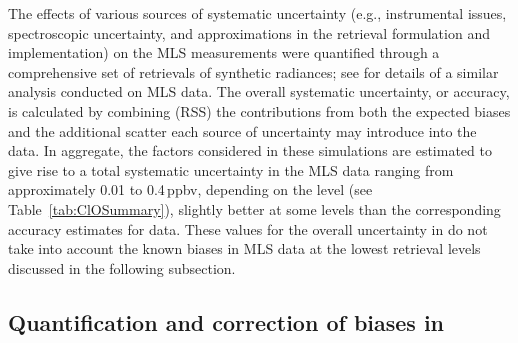 The effects of various sources of systematic uncertainty (e.g., instrumental issues, spectroscopic uncertainty, and approximations in the retrieval formulation and implementation) on the MLS \thisv {} measurements were quantified through a comprehensive set of retrievals of synthetic radiances; see \citet{SanteeEtal:2008:ClO} for details of a similar analysis conducted on MLS \vii {} data. The overall systematic uncertainty, or accuracy, is calculated by combining (RSS) the contributions from both the expected biases and the additional scatter each source of uncertainty may introduce into the data. In aggregate, the factors considered in these simulations are estimated to give rise to a total systematic uncertainty in the MLS \thisv {} data ranging from approximately 0.01 to 0.4\,ppbv, depending on the level (see Table~\ref{tab:ClOSummary}), slightly better at some levels than the corresponding accuracy estimates for \prevv {} data. These values for the overall uncertainty in \thisv {} do not take into account the known biases in MLS  data at the lowest retrieval levels discussed in the following subsection.

\subsection{Quantification and correction of biases in
  \thisv}
\label{sec:cloBias}

